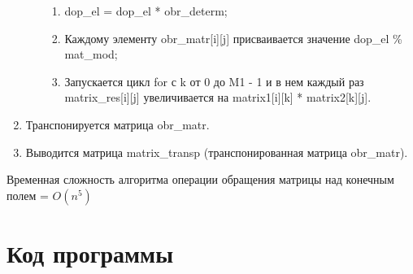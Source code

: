 \documentclass[bachelor, och, labwork]{shiza}
\begin{document}
\begin{enumerate}
\begin{enumerate}
\begin{enumerate}
					\item dop\_el = dop\_el * obr\_determ;
					\item Каждому элементу obr\_matr[i][j] присваивается значение dop\_el \% mat\_mod;
					\item Запускается цикл for с k от 0 до M1 - 1 и в нем каждый раз matrix\_res[i][j] увеличивается на
					matrix1[i][k] * matrix2[k][j].
				\end{enumerate}
			\end{enumerate}
			\item Транспонируется матрица obr\_matr.
			\item Выводится матрица matrix\_transp (транспонированная матрица obr\_matr).
		\end{enumerate} 
	
	Временная сложность алгоритма операции обращения матрицы над конечным полем = $O(n^5)$

	
	
	
	\section{Код программы}		
	
\end{document}
